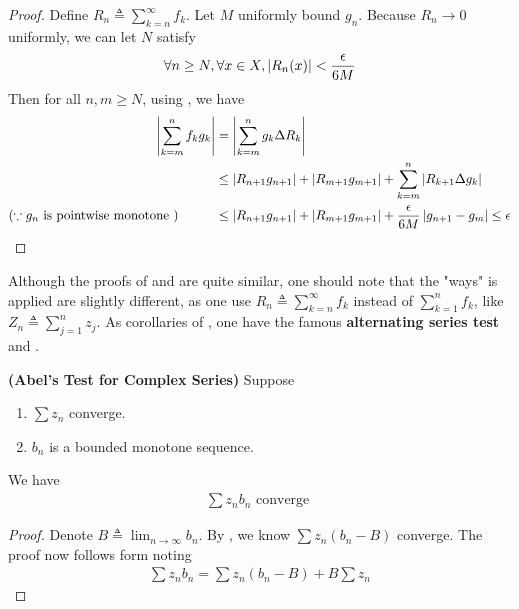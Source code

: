 \documentclass{report}
\begin{document}
\begin{proof}
Define $R_n\triangleq \sum_{k=n}^{\infty}f_k$. Let $M$ uniformly bound $g_n$. Because $R_n\to 0$ uniformly, we can let $N$ satisfy 
 \begin{align*}
\forall n\geq N, \forall x\in X,\left|R_n(x)\right|<\frac{\epsilon}{6M} 
\end{align*}
Then for all $n,m\geq N$, using , we have
\begin{align*}
  \left|\sum_{k=m}^{n}f_kg_k\right|&=\left|\sum_{k=m}^n g_k\Delta R_k \right|\\
  &\leq \left|R_{n+1}g_{n+1}\right|+ \left|R_{m+1}g_{m+1}\right|+ \sum_{k=m}^n\left| R_{k+1}\Delta g_k\right| \\
  (\because g_n\text{ is pointwise monotone })\hspace{1cm}&\leq \left|R_{n+1}g_{n+1}\right|+ \left|R_{m+1}g_{m+1}\right|+ \frac{\epsilon }{6M} \left|g_{n+1}-g_m\right|\leq \epsilon 
\end{align*}
\end{proof}
\begin{mdframed}
Although the proofs of  and  are quite similar, one should note that the "ways"  is applied are slightly different, as one use $R_n\triangleq \sum_{k=n}^{\infty}f_k$ instead of $\sum_{k=1}^n f_k$, like $Z_n\triangleq \sum_{j=1}^n z_j$. As corollaries of  , one have the famous \textbf{alternating series test} and . 
\end{mdframed}
\begin{theorem}
\label{Abel's Test for Complex Series}
\textbf{(Abel's Test for Complex Series)} Suppose 
\begin{enumerate}[label=(\alph*)]
  \item $\sum z_n$ converge. 
  \item $b_n$ is a bounded monotone sequence.
\end{enumerate}
We have 
\begin{align*}
\sum z_nb_n\text{ converge }
\end{align*}
\end{theorem}
\begin{proof}
Denote $B\triangleq \lim_{n\to \infty}b_n$. By , we know $\sum z_n(b_n-B)$ converge. The proof now follows form noting 
\begin{align*}
\sum z_nb_n= \sum z_n(b_n-B)+ B \sum  z_n
\end{align*}
\end{proof}
\end{document}
